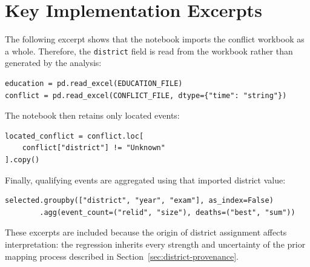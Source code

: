 \documentclass[11pt]{article}
\begin{document}
\section{Key Implementation Excerpts}

The following excerpt shows that the notebook imports the conflict workbook as a whole. Therefore, the \texttt{district} field is read from the workbook rather than generated by the analysis:

\begin{lstlisting}
education = pd.read_excel(EDUCATION_FILE)
conflict = pd.read_excel(CONFLICT_FILE, dtype={"time": "string"})
\end{lstlisting}

The notebook then retains only located events:

\begin{lstlisting}
located_conflict = conflict.loc[
    conflict["district"] != "Unknown"
].copy()
\end{lstlisting}

Finally, qualifying events are aggregated using that imported district value:

\begin{lstlisting}
selected.groupby(["district", "year", "exam"], as_index=False)
        .agg(event_count=("relid", "size"), deaths=("best", "sum"))
\end{lstlisting}

These excerpts are included because the origin of district assignment affects interpretation: the regression inherits every strength and uncertainty of the prior mapping process described in Section~\ref{sec:district-provenance}.
\end{document}
